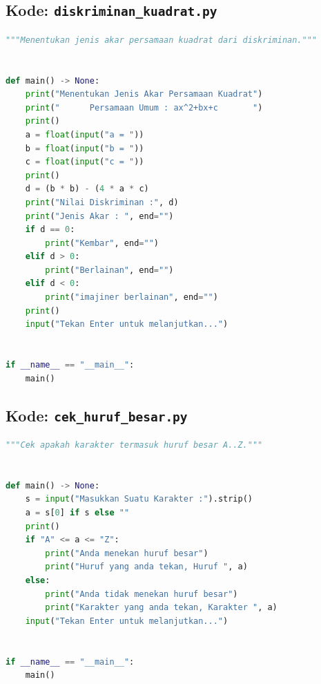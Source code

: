 ﻿\documentclass[../main.tex]{subfiles}
\begin{document}
\subsection{Kode: \texttt{diskriminan\_kuadrat.py}}
\introstudikasuskode
\begin{lstlisting}[language=Python,caption={\texttt{diskriminan\_kuadrat.py}}]
"""Menentukan jenis akar persamaan kuadrat dari diskriminan."""


def main() -> None:
    print("Menentukan Jenis Akar Persamaan Kuadrat")
    print("      Persamaan Umum : ax^2+bx+c       ")
    print()
    a = float(input("a = "))
    b = float(input("b = "))
    c = float(input("c = "))
    print()
    d = (b * b) - (4 * a * c)
    print("Nilai Diskriminan :", d)
    print("Jenis Akar : ", end="")
    if d == 0:
        print("Kembar", end="")
    elif d > 0:
        print("Berlainan", end="")
    elif d < 0:
        print("imajiner berlainan", end="")
    print()
    input("Tekan Enter untuk melanjutkan...")


if __name__ == "__main__":
    main()
\end{lstlisting}

\subsection{Kode: \texttt{cek\_huruf\_besar.py}}
\introstudikasuskode
\begin{lstlisting}[language=Python,caption={\texttt{cek\_huruf\_besar.py}}]
"""Cek apakah karakter termasuk huruf besar A..Z."""


def main() -> None:
    s = input("Masukkan Suatu Karakter :").strip()
    a = s[0] if s else ""
    print()
    if "A" <= a <= "Z":
        print("Anda menekan huruf besar")
        print("Huruf yang anda tekan, Huruf ", a)
    else:
        print("Anda tidak menekan huruf besar")
        print("Karakter yang anda tekan, Karakter ", a)
    input("Tekan Enter untuk melanjutkan...")


if __name__ == "__main__":
    main()
\end{lstlisting}
\end{document}
